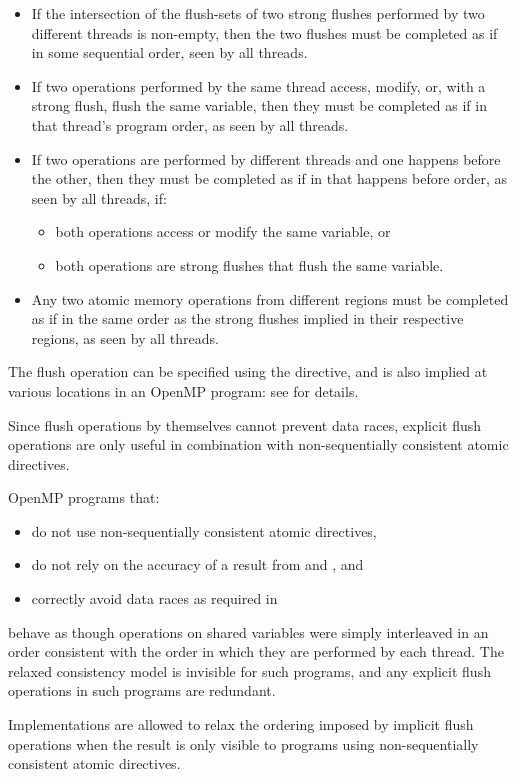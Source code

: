 \begin{itemize}
\item If the intersection of the flush-sets of two strong flushes
    performed by two different threads is non-empty, then the two flushes must
    be completed as if in some sequential order, seen by all threads.

\item If two operations performed by the same thread access, modify, or, with
    a strong flush, flush the same variable, then they must be
    completed as if in that thread's program order, as seen by all threads.

\item If two operations are performed by different threads and one happens
    before the other, then they must be completed as if in that happens before
    order, as seen by all threads, if:
    \begin{itemize}
        \item both operations access or modify the same variable, or
        \item both operations are strong flushes that flush the same variable.
    \end{itemize}

\item Any two atomic memory operations from different  regions
    must be completed as if in the same order as the strong flushes
    implied in their respective regions, as seen by all threads.
\end{itemize}

The flush operation can be specified using the  directive, and is also implied at
various locations in an OpenMP program: see  for details.

\begin{note}
Since flush operations by themselves cannot prevent data races, explicit flush
operations are only useful in combination with non-sequentially consistent atomic
directives.
\end{note}

OpenMP programs that:

\begin{itemize}[rightmargin=11ex]
\item do not use non-sequentially consistent atomic directives,

\item do not rely on the accuracy of a  result from
 and , and

\item correctly avoid data races as required in 
\end{itemize}

behave as though operations on shared variables were simply interleaved in an order
consistent with the order in which they are performed by each thread. The relaxed
consistency model is invisible for such programs, and any explicit flush operations in
such programs are redundant.

Implementations are allowed to relax the ordering imposed by implicit flush operations
when the result is only visible to programs using non-sequentially consistent atomic
directives.
